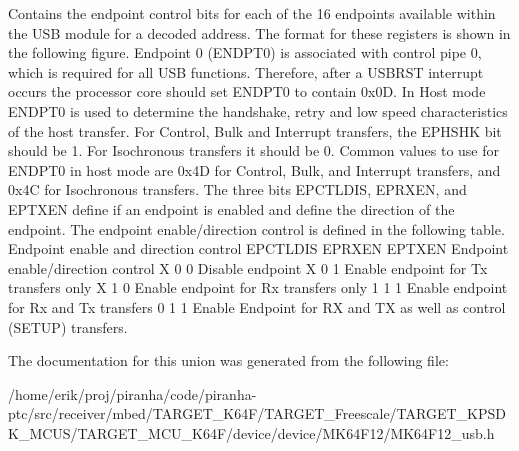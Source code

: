 Contains the endpoint control bits for each of the 16 endpoints available within the U\+SB module for a decoded address. The format for these registers is shown in the following figure. Endpoint 0 (E\+N\+D\+P\+T0) is associated with control pipe 0, which is required for all U\+SB functions. Therefore, after a U\+S\+B\+R\+ST interrupt occurs the processor core should set E\+N\+D\+P\+T0 to contain 0x0D. In Host mode E\+N\+D\+P\+T0 is used to determine the handshake, retry and low speed characteristics of the host transfer. For Control, Bulk and Interrupt transfers, the E\+P\+H\+S\+HK bit should be 1. For Isochronous transfers it should be 0. Common values to use for E\+N\+D\+P\+T0 in host mode are 0x4D for Control, Bulk, and Interrupt transfers, and 0x4C for Isochronous transfers. The three bits E\+P\+C\+T\+L\+D\+IS, E\+P\+R\+X\+EN, and E\+P\+T\+X\+EN define if an endpoint is enabled and define the direction of the endpoint. The endpoint enable/direction control is defined in the following table. Endpoint enable and direction control E\+P\+C\+T\+L\+D\+IS E\+P\+R\+X\+EN E\+P\+T\+X\+EN Endpoint enable/direction control X 0 0 Disable endpoint X 0 1 Enable endpoint for Tx transfers only X 1 0 Enable endpoint for Rx transfers only 1 1 1 Enable endpoint for Rx and Tx transfers 0 1 1 Enable Endpoint for RX and TX as well as control (S\+E\+T\+UP) transfers. 

The documentation for this union was generated from the following file\+:\begin{DoxyCompactItemize}
\item 
/home/erik/proj/piranha/code/piranha-\/ptc/src/receiver/mbed/\+T\+A\+R\+G\+E\+T\+\_\+\+K64\+F/\+T\+A\+R\+G\+E\+T\+\_\+\+Freescale/\+T\+A\+R\+G\+E\+T\+\_\+\+K\+P\+S\+D\+K\+\_\+\+M\+C\+U\+S/\+T\+A\+R\+G\+E\+T\+\_\+\+M\+C\+U\+\_\+\+K64\+F/device/device/\+M\+K64\+F12/M\+K64\+F12\+\_\+usb.\+h\end{DoxyCompactItemize}
